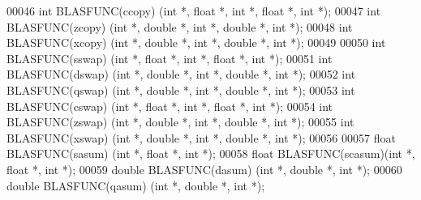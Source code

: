 \begin{DoxyCode}
00046 \textcolor{keywordtype}{int}    BLASFUNC(ccopy) (\textcolor{keywordtype}{int} *, \textcolor{keywordtype}{float}  *, \textcolor{keywordtype}{int} *, \textcolor{keywordtype}{float}  *, \textcolor{keywordtype}{int} *);
00047 \textcolor{keywordtype}{int}    BLASFUNC(zcopy) (\textcolor{keywordtype}{int} *, \textcolor{keywordtype}{double} *, \textcolor{keywordtype}{int} *, \textcolor{keywordtype}{double} *, \textcolor{keywordtype}{int} *);
00048 \textcolor{keywordtype}{int}    BLASFUNC(xcopy) (\textcolor{keywordtype}{int} *, \textcolor{keywordtype}{double} *, \textcolor{keywordtype}{int} *, \textcolor{keywordtype}{double} *, \textcolor{keywordtype}{int} *);
00049 
00050 \textcolor{keywordtype}{int}    BLASFUNC(sswap) (\textcolor{keywordtype}{int} *, \textcolor{keywordtype}{float}  *, \textcolor{keywordtype}{int} *, \textcolor{keywordtype}{float}  *, \textcolor{keywordtype}{int} *);
00051 \textcolor{keywordtype}{int}    BLASFUNC(dswap) (\textcolor{keywordtype}{int} *, \textcolor{keywordtype}{double} *, \textcolor{keywordtype}{int} *, \textcolor{keywordtype}{double} *, \textcolor{keywordtype}{int} *);
00052 \textcolor{keywordtype}{int}    BLASFUNC(qswap) (\textcolor{keywordtype}{int} *, \textcolor{keywordtype}{double} *, \textcolor{keywordtype}{int} *, \textcolor{keywordtype}{double} *, \textcolor{keywordtype}{int} *);
00053 \textcolor{keywordtype}{int}    BLASFUNC(cswap) (\textcolor{keywordtype}{int} *, \textcolor{keywordtype}{float}  *, \textcolor{keywordtype}{int} *, \textcolor{keywordtype}{float}  *, \textcolor{keywordtype}{int} *);
00054 \textcolor{keywordtype}{int}    BLASFUNC(zswap) (\textcolor{keywordtype}{int} *, \textcolor{keywordtype}{double} *, \textcolor{keywordtype}{int} *, \textcolor{keywordtype}{double} *, \textcolor{keywordtype}{int} *);
00055 \textcolor{keywordtype}{int}    BLASFUNC(xswap) (\textcolor{keywordtype}{int} *, \textcolor{keywordtype}{double} *, \textcolor{keywordtype}{int} *, \textcolor{keywordtype}{double} *, \textcolor{keywordtype}{int} *);
00056 
00057 \textcolor{keywordtype}{float}  BLASFUNC(sasum) (\textcolor{keywordtype}{int} *, \textcolor{keywordtype}{float}  *, \textcolor{keywordtype}{int} *);
00058 \textcolor{keywordtype}{float}  BLASFUNC(scasum)(\textcolor{keywordtype}{int} *, \textcolor{keywordtype}{float}  *, \textcolor{keywordtype}{int} *);
00059 \textcolor{keywordtype}{double} BLASFUNC(dasum) (\textcolor{keywordtype}{int} *, \textcolor{keywordtype}{double} *, \textcolor{keywordtype}{int} *);
00060 \textcolor{keywordtype}{double} BLASFUNC(qasum) (\textcolor{keywordtype}{int} *, \textcolor{keywordtype}{double} *, \textcolor{keywordtype}{int} *);

\end{DoxyCode}
